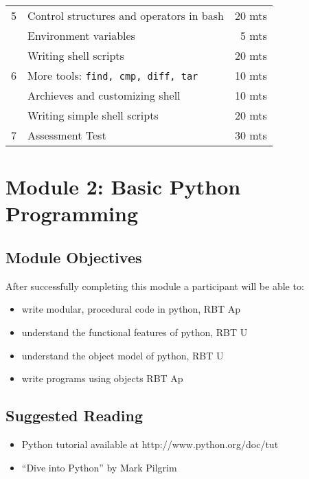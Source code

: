 \documentclass{article}
\begin{document}
\begin{tabular}{llr}
5 & Control structures and operators in bash                         & 20 mts\\
  & Environment variables                                            & ~5 mts\\
  & Writing shell scripts                                            & 20 mts\\\hline

6 & More tools: \tt{find, cmp, diff, tar}                            & 10 mts\\
  & Archieves and customizing shell                                  & 10 mts\\ 
  & Writing simple shell scripts                                     & 20 mts\\\hline

7 & Assessment Test                                                  & 30 mts\\\hline\hline
\end{tabular}

\section{Module 2: Basic Python Programming}
\label{BPyP}
\subsection{Module Objectives}
After successfully completing this module a participant will be able to:
	\begin{itemize}
            \item write modular, procedural code in python, \hfill RBT Ap
            \item understand the functional features of python, \hfill RBT U\phantom{p}
            \item understand the object model of python, \hfill RBT U\phantom{p}
            \item write programs using objects \hfill RBT Ap
	\end{itemize}
\subsection{Suggested Reading}
\begin{itemize}
    \item Python tutorial available at http://www.python.org/doc/tut
    \item ``Dive into Python'' by Mark Pilgrim
\end{itemize}
\end{document}
